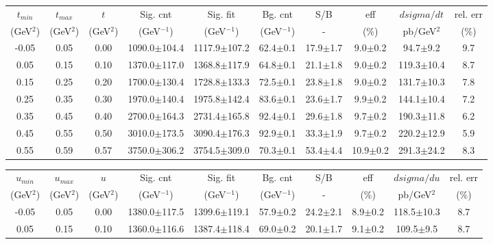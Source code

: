 \begin{landscape}
\begin{table}[hbpt]
  \begin{center}
    \begin{tabular}{|c|c|c|c|c|c|c|c|c|c|}
      \hline
      $t_{min}$ & $t_{max}$ & $t$ & Sig. cnt & Sig. fit & Bg. cnt & S/B & eff & $dsigma/dt$ & rel. err \\ 
      (GeV$^{2}$) & (GeV$^{2}$) & (GeV$^{2}$) & (GeV$^{-1}$) & (GeV$^{-1}$) & (GeV$^{-1}$) & - & (\%) & pb/GeV$^{2}$ & (\%) \\	
      \hline
 -0.05 & 0.05 & 0.00 & 1090.0$\pm$104.4 &  1117.9$\pm$107.2 &  62.4$\pm$0.1 &  17.9$\pm$1.7 & 9.0$\pm$0.2 &  94.7$\pm$9.2 & 9.7 \\ 
 \hline 
 0.05 & 0.15 & 0.10 & 1370.0$\pm$117.0 &  1368.8$\pm$117.9 &  64.8$\pm$0.1 &  21.1$\pm$1.8 & 9.0$\pm$0.2 &  119.3$\pm$10.4 & 8.7 \\ 
 \hline 
 0.15 & 0.25 & 0.20 & 1700.0$\pm$130.4 &  1728.8$\pm$133.3 &  72.5$\pm$0.1 &  23.8$\pm$1.8 & 9.0$\pm$0.2 &  131.7$\pm$10.3 & 7.8 \\ 
 \hline 
 0.25 & 0.35 & 0.30 & 1970.0$\pm$140.4 &  1975.8$\pm$142.4 &  83.6$\pm$0.1 &  23.6$\pm$1.7 & 9.9$\pm$0.2 &  144.1$\pm$10.4 & 7.2 \\ 
 \hline 
 0.35 & 0.45 & 0.40 & 2700.0$\pm$164.3 &  2731.4$\pm$165.8 &  92.4$\pm$0.1 &  29.6$\pm$1.8 & 9.7$\pm$0.2 &  190.3$\pm$11.8 & 6.2 \\ 
 \hline 
 0.45 & 0.55 & 0.50 & 3010.0$\pm$173.5 &  3090.4$\pm$176.3 &  92.9$\pm$0.1 &  33.3$\pm$1.9 & 9.7$\pm$0.2 &  220.2$\pm$12.9 & 5.9 \\ 
 \hline 
 0.55 & 0.59 & 0.57 & 3750.0$\pm$306.2 &  3754.5$\pm$309.0 &  70.3$\pm$0.1 &  53.4$\pm$4.4 & 10.9$\pm$0.2 &  291.3$\pm$24.2 & 8.3 \\ 
 \hline 
    \end{tabular}
    \begin{tabular}{|c|c|c|c|c|c|c|c|c|c|}
      \hline
      $u_{min}$ & $u_{max}$ & $u$ & Sig. cnt & Sig. fit & Bg. cnt & S/B & eff & $dsigma/du$ & rel. err \\ 
      (GeV$^{2}$) & (GeV$^{2}$) & (GeV$^{2}$) & (GeV$^{-1}$) & (GeV$^{-1}$) & (GeV$^{-1}$) & - & (\%) & pb/GeV$^{2}$ & (\%) \\	
      \hline
 -0.05 & 0.05 & 0.00 & 1380.0$\pm$117.5 &  1399.6$\pm$119.1 &  57.9$\pm$0.2 &  24.2$\pm$2.1 & 8.9$\pm$0.2 &  118.5$\pm$10.3 & 8.7 \\ 
 \hline 
 0.05 & 0.15 & 0.10 & 1360.0$\pm$116.6 &  1387.4$\pm$118.4 &  69.0$\pm$0.2 &  20.1$\pm$1.7 & 9.1$\pm$0.2 &  109.5$\pm$9.5 & 8.7 \\ 

\end{tabular}
\end{center}
\end{table}
\end{landscape}
